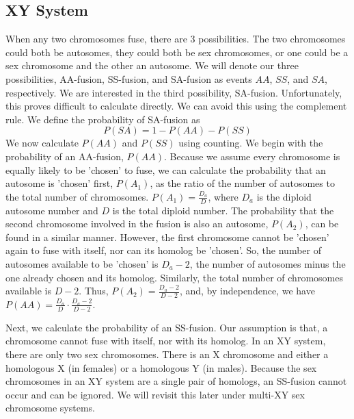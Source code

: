 \documentclass[12pt]{article}
\begin{document}
\subsection{XY System}
When any two chromosomes fuse, there are 3 possibilities. 
The two chromosomes could both be autosomes, they could both be sex chromosomes, or one could be a sex chromosome and the other an autosome. 
We will denote our three possibilities, AA-fusion, SS-fusion, and SA-fusion as events $AA$, $SS$, and $SA$, respectively. 
We are interested in the third possibility, SA-fusion. Unfortunately, this proves difficult to calculate directly. We can avoid this using the complement rule. 
We define the probability of SA-fusion as
\begin{equation}
P(SA)=1-P(AA)-P(SS)
\end{equation}
We now calculate $P(AA)$ and $P(SS)$ using counting.
We begin with the probability of an AA-fusion, $P(AA)$.
Because we assume every chromosome is equally likely to be 'chosen' to fuse, we can calculate the probability that an autosome is 'chosen' first, $P(A_1)$, as the ratio of the number of autosomes to the total number of chromosomes. 
$P(A_1) = \frac{D_a}{D}$, where $D_a$ is the diploid autosome number and $D$ is the total diploid number.
The probability that the second chromosome involved in the fusion is also an autosome, $P(A_2)$, can be found in a similar manner.
However, the first chromosome cannot be 'chosen' again to fuse with itself, nor can its homolog be 'chosen'. 
So, the number of autosomes available to be 'chosen' is $D_a - 2$, the number of autosomes minus the one already chosen and its homolog.
Similarly, the total number of chromosomes available is $D - 2$. 
Thus, $P(A_2) = \frac{D_a - 2}{D - 2}$, and, by independence, we have $P(AA) = \frac{D_a}{D} \cdot \frac{D_a - 2}{D - 2}$.

Next, we calculate the probability of an SS-fusion. 
Our assumption is that, a chromosome cannot fuse with itself, nor with its homolog. 
In an XY system, there are only two sex chromosomes. 
There is an X chromosome and either a homologous X (in females) or a homologous Y (in males).
Because the sex chromosomes in an XY system are a single pair of homologs, an SS-fusion cannot occur and can be ignored. 
We will revisit this later under multi-XY sex chromosome systems.
\end{document}
